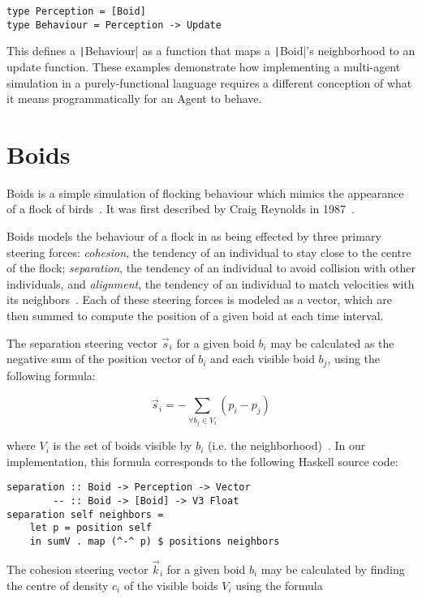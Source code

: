 \begin{verbatim}
type Perception = [Boid]
type Behaviour = Perception -> Update
\end{verbatim}

This defines a \texttt|Behaviour| as a function that maps a \texttt|Boid|'s neighborhood to
an update function. These examples demonstrate how implementing a multi-agent
simulation in a purely-functional language requires a different conception of
what it means programmatically for an Agent to behave.

\section{Boids}

Boids is a simple simulation of flocking behaviour which mimics the appearance of a flock of birds~\cite{hartman2006autonomous}. It was first described by Craig Reynolds in 1987~\cite{reynolds1987flocks}.

Boids models the behaviour of a flock in as being effected by three primary steering forces: \textit{cohesion}, the tendency of an individual to stay close to the centre of the flock; \textit{separation}, the tendency of an individual to avoid collision with other individuals, and \textit{alignment}, the tendency of an individual to match velocities with its neighbors~\cite{hartman2006autonomous,reynolds1987flocks}. Each of these steering forces is modeled as a vector, which are then summed to compute the position of a given boid at each time interval.

The separation steering vector $\vec{s}_i$ for a given boid $b_i$ may be calculated as the negative sum of the position vector of $b_i$ and each visible boid $b_j$, using the following formula:

\[ \vec{s}_i = - \sum\limits_{\forall b_j \in V_i} (p_i - p_j) \]

where $V_i$ is the set of boids visible by $b_i$ (i.e. the neighborhood)~\cite{hartman2006autonomous}. In our implementation, this formula corresponds to the following Haskell source code:

\begin{verbatim}
separation :: Boid -> Perception -> Vector
        -- :: Boid -> [Boid] -> V3 Float
separation self neighbors =
    let p = position self
    in sumV . map (^-^ p) $ positions neighbors
\end{verbatim}

The cohesion steering vector $\vec{k}_i$ for a given boid $b_i$ may be calculated by finding the centre of density $c_i$ of the visible boids $V_i$ using the formula

